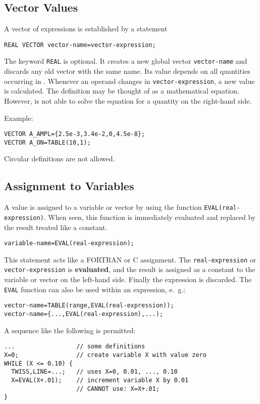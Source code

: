\subsection{Vector Values}
\label{sec:vector}
A vector of expressions is established by a statement
\begin{verbatim}
REAL VECTOR vector-name=vector-expression;
\end{verbatim}
The keyword \texttt{REAL} is optional.
It creates a new global vector \texttt{vector-name}
and discards any old vector with the same name.
Its value depends on all quantities occurring in 
.
Whenever an operand changes in \texttt{vector-expression},
a new value is calculated.
The definition may be thought of as a mathematical equation.
However, \opal is not able to solve the equation for a quantity on the
right-hand side.

\noindent Example:
\begin{verbatim}
VECTOR A_AMPL={2.5e-3,3.4e-2,0,4.5e-8};
VECTOR A_ON=TABLE(10,1);
\end{verbatim}
Circular definitions are not allowed.

\subsection{Assignment to Variables}
\label{sec:eval}
A value is assigned to a variable or vector by using the function
\texttt{EVAL(real-expression)}.
When seen, this function is immediately evaluated and replaced by the
result treated like a constant.
\begin{verbatim}
variable-name=EVAL(real-expression);
\end{verbatim}
This statement acts like a FORTRAN or C assignment.
The \texttt{real-expression} or \texttt{vector-expression} is
\textbf{evaluated}, 
and the result is assigned as a constant to the variable or vector on
the left-hand side. 
Finally the expression is discarded.
The \texttt{EVAL} function can also be used within an expression, e.~g.:
\begin{verbatim}
vector-name=TABLE(range,EVAL(real-expression));
vector-name={...,EVAL(real-expression),...);
\end{verbatim}
A sequence like the following is permitted:
\begin{verbatim}
...                 // some definitions
X=0;                // create variable X with value zero
WHILE (X <= 0.10) {
  TWISS,LINE=...;   // uses X=0, 0.01, ..., 0.10
  X=EVAL(X+.01);    // increment variable X by 0.01
                    // CANNOT use: X=X+.01;
}
\end{verbatim}

